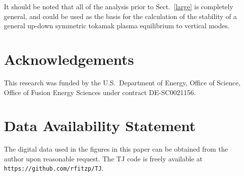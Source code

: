 \documentclass[12pt,prb,aps]{revtex4-1}
\begin{document}
It should be noted that all of the analysis prior to Sect.~\ref{large} is completely general, and could be used as the basis for the calculation of the
stability of a general up-down symmetric tokamak plasma equilibrium to vertical modes. 

\section*{Acknowledgements}
This research was funded by the  U.S.\ Department of Energy, Office of Science, Office of Fusion Energy Sciences under contract DE-SC0021156.

\section*{Data Availability Statement}
The digital data used in the figures in this paper can be obtained from the author upon reasonable request. The TJ code is freely 
available at {\tt https://github.com/rfitzp/TJ}. 
\end{document}

